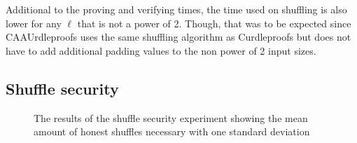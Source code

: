 Additional to the proving and verifying times, the time used on shuffling is also lower for any $\ell$ that is not a power of 2.
Though, that was to be expected since CAAUrdleproofs uses the same shuffling algorithm as Curdleproofs but does not have to add additional padding values to the non power of 2 input sizes.


\subsection{Shuffle security}\label{subsec:Shuffle-security}

\begin{figure}[!htb]
    \centering
    \qquad
    \caption{The results of the shuffle security experiment showing the mean amount of honest shuffles necessary with one standard deviation}%
    \label{fig:shufflesecurity}%
\end{figure}


